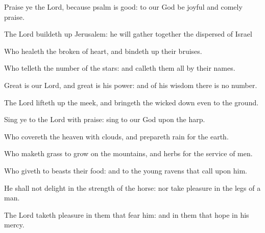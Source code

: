 ﻿\item Praise ye the Lord, because psalm is good: to our God be joyful and comely praise.
\item The Lord buildeth up Jerusalem: he will gather together the dispersed of Israel
\item Who healeth the broken of heart, and bindeth up their bruises.
\item Who telleth the number of the stars: and calleth them all by their names.
\item Great is our Lord, and great is his power: and of his wisdom there is no number.
\item The Lord lifteth up the meek, and bringeth the wicked down even to the ground.
\item Sing ye to the Lord with praise: sing to our God upon the harp.
\item Who covereth the heaven with clouds, and prepareth rain for the earth.
\item Who maketh grass to grow on the mountains, and herbs for the service of men.
\item Who giveth to beasts their food: and to the young ravens that call upon him.
\item He shall not delight in the strength of the horse: nor take pleasure in the legs of a man.
\item The Lord taketh pleasure in them that fear him: and in them that hope in his mercy.